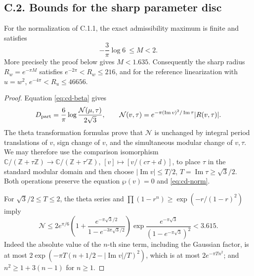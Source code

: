 \subsection{C.2. Bounds for the sharp parameter disc}
\begin{proposition}[C.2.1; Proved]\label{st:C.2.1}
For the normalization of C.1.1, the exact admissibility maximum is finite
and satisfies
\[
 -\frac3\pi\log6\ \leq M<2.
\]
More precisely the proof below gives \(M<1.635\). Consequently the sharp
radius \(R_w=e^{-\pi M}\) satisfies
\(e^{-2\pi}<R_w\leq216\), and for the reference linearization with
\(u=w^2\), \(e^{-4\pi}<R_u\leq46656\).
\end{proposition}
\begin{proof}
Equation \eqref{eq:cd-beta} gives
\begin{equation}\label{eq:cd-norm}
 D_{\rm part}=\frac6\pi\log\frac{\mathcal N(\mu,\tau)}{2\sqrt3},
 \qquad
 \mathcal N(v,\tau)=e^{-\pi(\operatorname{Im}v)^2/\operatorname{Im}\tau}
 |R(v,\tau)|.
\end{equation}
The theta transformation formulas prove that \(\mathcal N\) is unchanged
by integral period translations of \(v\), sign change of \(v\), and the
simultaneous modular change of \(v,\tau\). We may therefore use the
comparison isomorphism \(\mathbb C/(\mathbb Z+\tau\mathbb Z)\to
\mathbb C/(\mathbb Z+\tau'\mathbb Z)\), \([v]\mapsto[v/(c\tau+d)]\), to
place \(\tau\) in the standard modular domain and then choose
\(|\operatorname{Im}v|\leq T/2\), \(T=\operatorname{Im}\tau\geq\sqrt3/2\).
Both operations preserve the equation \(\wp(v)=0\) and \eqref{eq:cd-norm}.

For \(\sqrt3/2\leq T\leq2\), the theta series and
\(\prod(1-r^n)\geq\exp(-r/(1-r)^2)\) imply
\[
 \mathcal N\leq
 2e^{\pi/6}\left(1+\frac{e^{-\pi\sqrt3/2}}
 {1-e^{-3\pi\sqrt3/2}}\right)
 \exp\frac{e^{-\pi\sqrt3}}{(1-e^{-\pi\sqrt3})^2}
 <3.615.
\]
Indeed the absolute value of the \(n\)-th sine term, including the
Gaussian factor, is at most
\(2\exp(-\pi T(n+1/2-|\operatorname{Im}v|/T)^2)\), which is at most
\(2e^{-\pi Tn^2}\); and \(n^2\geq1+3(n-1)\) for \(n\geq1\).


\end{proof}
